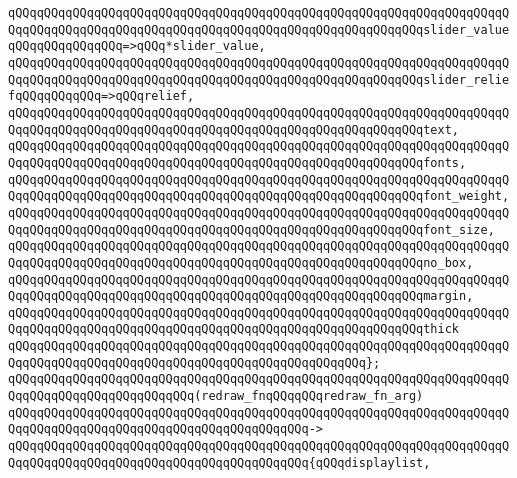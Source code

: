\verb|qQQqqQQqqQQqqQQqqQQqqQQqqQQqqQQqqQQqqQQqqQQqqQQqqQQqqQQqqQQqqQQqqQQqqQQqqQQqqQQqqQQqqQQqqQQqqQQqqQQqqQQqqQQqqQQqqQQqqQQqqQQqqQQqslider_valueqQQqqQQqqQQqqQQq=>qQQq*slider_value,|\newline
\verb|qQQqqQQqqQQqqQQqqQQqqQQqqQQqqQQqqQQqqQQqqQQqqQQqqQQqqQQqqQQqqQQqqQQqqQQqqQQqqQQqqQQqqQQqqQQqqQQqqQQqqQQqqQQqqQQqqQQqqQQqqQQqqQQqslider_reliefqQQqqQQqqQQq=>qQQqrelief,|\newline
\newline
\verb|qQQqqQQqqQQqqQQqqQQqqQQqqQQqqQQqqQQqqQQqqQQqqQQqqQQqqQQqqQQqqQQqqQQqqQQqqQQqqQQqqQQqqQQqqQQqqQQqqQQqqQQqqQQqqQQqqQQqqQQqqQQqqQQqtext,|\newline
\verb|qQQqqQQqqQQqqQQqqQQqqQQqqQQqqQQqqQQqqQQqqQQqqQQqqQQqqQQqqQQqqQQqqQQqqQQqqQQqqQQqqQQqqQQqqQQqqQQqqQQqqQQqqQQqqQQqqQQqqQQqqQQqqQQqfonts,|\newline
\verb|qQQqqQQqqQQqqQQqqQQqqQQqqQQqqQQqqQQqqQQqqQQqqQQqqQQqqQQqqQQqqQQqqQQqqQQqqQQqqQQqqQQqqQQqqQQqqQQqqQQqqQQqqQQqqQQqqQQqqQQqqQQqqQQqfont_weight,|\newline
\verb|qQQqqQQqqQQqqQQqqQQqqQQqqQQqqQQqqQQqqQQqqQQqqQQqqQQqqQQqqQQqqQQqqQQqqQQqqQQqqQQqqQQqqQQqqQQqqQQqqQQqqQQqqQQqqQQqqQQqqQQqqQQqqQQqfont_size,|\newline
\newline
\verb|qQQqqQQqqQQqqQQqqQQqqQQqqQQqqQQqqQQqqQQqqQQqqQQqqQQqqQQqqQQqqQQqqQQqqQQqqQQqqQQqqQQqqQQqqQQqqQQqqQQqqQQqqQQqqQQqqQQqqQQqqQQqqQQqno_box,|\newline
\verb|qQQqqQQqqQQqqQQqqQQqqQQqqQQqqQQqqQQqqQQqqQQqqQQqqQQqqQQqqQQqqQQqqQQqqQQqqQQqqQQqqQQqqQQqqQQqqQQqqQQqqQQqqQQqqQQqqQQqqQQqqQQqqQQqmargin,|\newline
\verb|qQQqqQQqqQQqqQQqqQQqqQQqqQQqqQQqqQQqqQQqqQQqqQQqqQQqqQQqqQQqqQQqqQQqqQQqqQQqqQQqqQQqqQQqqQQqqQQqqQQqqQQqqQQqqQQqqQQqqQQqqQQqqQQqthick|\newline
\verb|qQQqqQQqqQQqqQQqqQQqqQQqqQQqqQQqqQQqqQQqqQQqqQQqqQQqqQQqqQQqqQQqqQQqqQQqqQQqqQQqqQQqqQQqqQQqqQQqqQQqqQQqqQQqqQQqqQQqqQQq};|\newline
\newline
\verb|qQQqqQQqqQQqqQQqqQQqqQQqqQQqqQQqqQQqqQQqqQQqqQQqqQQqqQQqqQQqqQQqqQQqqQQqqQQqqQQqqQQqqQQqqQQqqQQq(redraw_fnqQQqqQQqredraw_fn_arg)|\newline
\verb|qQQqqQQqqQQqqQQqqQQqqQQqqQQqqQQqqQQqqQQqqQQqqQQqqQQqqQQqqQQqqQQqqQQqqQQqqQQqqQQqqQQqqQQqqQQqqQQqqQQqqQQqqQQqqQQq->|\newline
\verb|qQQqqQQqqQQqqQQqqQQqqQQqqQQqqQQqqQQqqQQqqQQqqQQqqQQqqQQqqQQqqQQqqQQqqQQqqQQqqQQqqQQqqQQqqQQqqQQqqQQqqQQqqQQqqQQq{qQQqdisplaylist,|\newline

